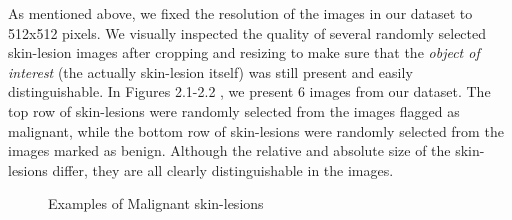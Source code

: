 \documentclass [MAS] {uclathes}
\begin{document}
As mentioned above, we fixed the resolution of the images in our dataset to 512x512 pixels. We visually inspected the quality of several randomly selected skin-lesion images after cropping and resizing to make sure that the \textit{object of interest} (the actually skin-lesion itself) was still present and easily distinguishable. In Figures 2.1-2.2 , we present 6 images from our dataset. The top row of skin-lesions were randomly selected from the images flagged as malignant, while the bottom row of skin-lesions were randomly selected from the images marked as benign. Although the relative and absolute size of the skin-lesions differ, they are all clearly distinguishable in the images. 

\begin{figure}[hbt!]
\hspace*{\fill}
\centering
{}\hspace{0.5em}
\hspace{0.5em}
\hspace*{\fill}
\label{fig:mel_examples}
\vspace{-1cm}
\caption{Examples of Malignant skin-lesions}
\end{figure}
\end{document}
